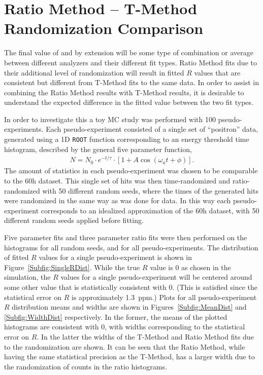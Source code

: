 
\thispagestyle{myheadings}

\graphicspath{{Body/Figures/Wa/T-Method-Comparison/}}

\chapter{Ratio Method -- T-Method Randomization Comparison}
\label{app:RTComparison}


The final value of \wa and by extension \amu will be some type of combination or average between different analyzers and their different fit types. Ratio Method fits due to their additional level of randomization will result in fitted $R$ values that are consistent but different from T-Method fits to the same data. In order to assist in combining the Ratio Method results with T-Method results, it is desirable to understand the expected difference in the fitted \wa value between the two fit types.


In order to investigate this a toy MC study was performed with 100 pseudo-experiments. Each pseudo-experiment consisted of a single set of ``positron'' data, generated using a 1D \texttt{ROOT} function corresponding to an energy threshold time histogram, described by the general five parameter function,
        \begin{align}
            N = N_{0} \cdot e^{-t/\tau} \cdot [1 + A \cos(\omega_{a}t+\phi)].
        \end{align}
The amount of statistics in each pseudo-experiment was chosen to be comparable to the 60h dataset. This single set of hits was then time-randomized and ratio-randomized with 50 different random seeds, where the times of the generated hits were randomized in the same way as was done for data. In this way each pseudo-experiment corresponds to an idealized approximation of the 60h dataset, with 50 different random seeds applied before fitting.

Five parameter fits and three parameter ratio fits were then performed on the histograms for all random seeds, and for all pseudo-experiments. The distribution of fitted $R$ values for a single pseudo-experiment is shown in Figure~\ref{Subfig:SingleRDist}. While the true $R$ value is 0 as chosen in the simulation, the $R$ values for a single pseudo-experiment will be centered around some other value that is statistically consistent with 0. (This is satisfied since the statistical error on $R$ is approximately \SI{1.3}{ppm}.) Plots for all pseudo-experiment $R$ distribution means and widths are shown in Figures~\ref{Subfig:MeanDist} and \ref{Subfig:WidthDist} respectively. In the former, the means of the plotted histograms are consistent with 0, with widths corresponding to the statistical error on $R$. In the latter the widths of the T-Method and Ratio Method fits due to the randomization are shown. It can be seen that the Ratio Method, while having the same statistical precision as the T-Method, has a larger width due to the randomization of counts in the ratio histograms. 


